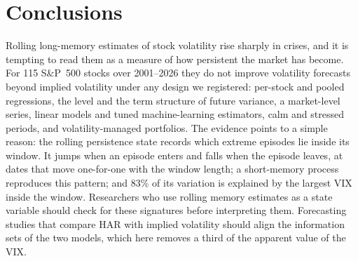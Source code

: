 \section{Conclusions}\label{sec:conclusions}

Rolling long-memory estimates of stock volatility rise sharply in crises, and
it is tempting to read them as a measure of how persistent the market has
become. For 115 S\&P~500 stocks over 2001--2026 they do not improve
volatility forecasts beyond implied volatility under any design we
registered: per-stock and pooled regressions, the level and the term
structure of future variance, a market-level series, linear models and tuned
machine-learning estimators, calm and stressed periods, and
volatility-managed portfolios. The evidence points to a simple reason: the
rolling persistence state records which extreme episodes lie inside its
window. It jumps when an episode enters and falls when the episode leaves, at
dates that move one-for-one with the window length; a short-memory process
reproduces this pattern; and 83\% of its variation is explained by the
largest VIX inside the window. Researchers who use rolling memory estimates
as a state variable should check for these signatures before interpreting
them. Forecasting studies that compare HAR with implied volatility should
align the information sets of the two models, which here removes a third of
the apparent value of the VIX.
